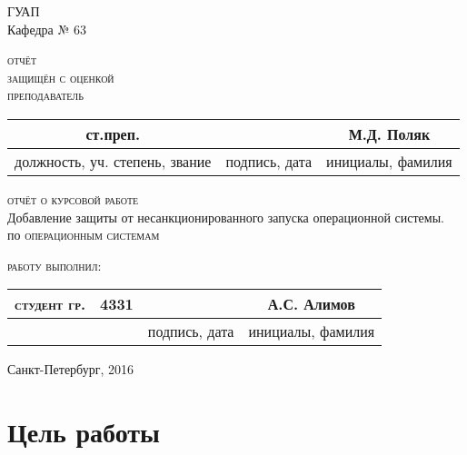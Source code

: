 \documentclass[a4paper]{article}
\begin{document}
 
\begin{center}
\hfill \break
\large{ГУАП}\\
\hfill \break
\normalsize{Кафедра № 63}\\
\hfill\break
\hfill \break
\begin{flushleft}
\textsc{отчёт}\\
\textsc{защищён с оценкой}\\
\textsc{преподаватель}\\
\end{flushleft}
\renewcommand{\arraystretch}{1} %
\renewcommand{\tabcolsep}{1cm}
\begin{center}
\begin{tabular}{ccc}
ст.преп. &  & М.Д. Поляк\\
\hline
\small{должность, уч. степень, звание} & \small{подпись, дата} & \small{инициалы, фамилия} \\
\hline
\end{tabular}
\end{center}
\hfill \break
\hfill \break
\textsc{отчёт о курсовой работе}\\
\hfill \break
\hfill \break
\hfill \break
\large{Добавление защиты от несанкционированного запуска операционной системы.}\\
\hfill \break
\hfill \break
\hfill \break
по \textsc{операционным системам}\\
\hfill \break
\hfill \break
\hfill \break
\begin{flushleft}
\textsc{работу выполнил:}
\end{flushleft}
\renewcommand{\arraystretch}{1} %
\renewcommand{\tabcolsep}{0,6cm}
\begin{tabular}{cccc}
\textsc{студент гр.} & 4331 & & А.С. Алимов \\
\hline
& & \small{подпись, дата} & \small{инициалы, фамилия} \\
\end{tabular}
\end{center}
\hfill \break
\hfill \break
\begin{center} Санкт-Петербург, 2016 \end{center}
\thispagestyle{empty} %
 
 
\newpage

\section{Цель работы}
\end{document}
